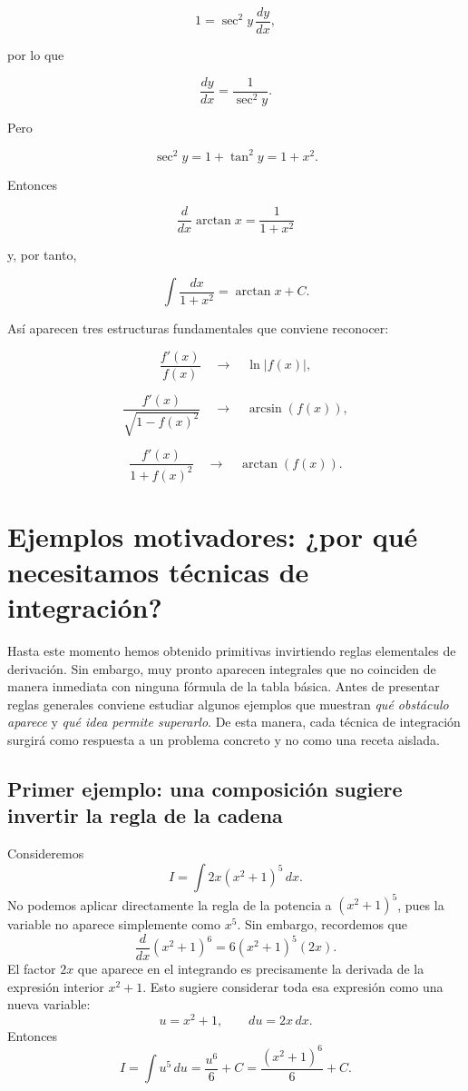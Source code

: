 \documentclass[12pt]{article}
\theoremstyle{definition}
\theoremstyle{remark}
\begin{document}
\[
1=\sec^2y\,\frac{dy}{dx},
\]

por lo que

\[
\frac{dy}{dx}
=
\frac1{\sec^2y}.
\]

Pero

\[
\sec^2y
=
1+\tan^2y
=
1+x^2.
\]

Entonces

\[
\boxed{
\frac{d}{dx}\arctan x
=
\frac1{1+x^2}
}
\]

y, por tanto,

\[
\boxed{
\int\frac{dx}{1+x^2}
=
\arctan x+C.
}
\]

Así aparecen tres estructuras fundamentales que conviene reconocer:

\[
\boxed{\frac{f'(x)}{f(x)}}
\quad\longrightarrow\quad
\ln|f(x)|,
\]

\[
\boxed{\frac{f'(x)}{\sqrt{1-f(x)^2}}}
\quad\longrightarrow\quad
\arcsin(f(x)),
\]

\[
\boxed{\frac{f'(x)}{1+f(x)^2}}
\quad\longrightarrow\quad
\arctan(f(x)).
\]



\section{Ejemplos motivadores: ¿por qué necesitamos técnicas de integración?}

Hasta este momento hemos obtenido primitivas invirtiendo reglas elementales de derivación. Sin embargo, muy pronto aparecen integrales que no coinciden de manera inmediata con ninguna fórmula de la tabla básica. Antes de presentar reglas generales conviene estudiar algunos ejemplos que muestran \emph{qué obstáculo aparece} y \emph{qué idea permite superarlo}. De esta manera, cada técnica de integración surgirá como respuesta a un problema concreto y no como una receta aislada.

\subsection*{Primer ejemplo: una composición sugiere invertir la regla de la cadena}
Consideremos
\[
I=\int 2x(x^2+1)^5\,dx.
\]
No podemos aplicar directamente la regla de la potencia a $(x^2+1)^5$, pues la variable no aparece simplemente como $x^5$. Sin embargo, recordemos que
\[
\frac{d}{dx}(x^2+1)^6=6(x^2+1)^5(2x).
\]
El factor $2x$ que aparece en el integrando es precisamente la derivada de la expresión interior $x^2+1$. Esto sugiere considerar toda esa expresión como una nueva variable:
\[
u=x^2+1,\qquad du=2x\,dx.
\]
Entonces
\[
I=\int u^5\,du=\frac{u^6}{6}+C
=\boxed{\frac{(x^2+1)^6}{6}+C}.
\]
\end{document}
